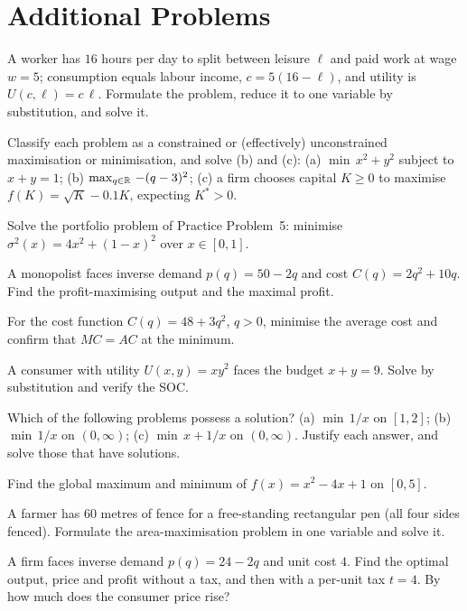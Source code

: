 \section{Additional Problems}

\begin{problems}
  \item A worker has $16$ hours per day to split between leisure
        $\ell$ and paid work at wage $w=5$; consumption equals labour
        income, $c=5(16-\ell)$, and utility is $U(c,\ell)=c\,\ell$.
        Formulate the problem, reduce it to one variable by
        substitution, and solve it.
  \item Classify each problem as a constrained or (effectively)
        unconstrained maximisation or minimisation, and solve (b) and
        (c): (a) $\min\, x^{2}+y^{2}$ subject to $x+y=1$;
        (b) $\max_{q\in\mathbb{R}}\, -(q-3)^{2}$;
        (c) a firm chooses capital $K\ge 0$ to maximise
        $f(K)=\sqrt{K}-0.1K$, expecting $K^{*}>0$.
  \item Solve the portfolio problem of Practice Problem~5: minimise
        $\sigma^{2}(x)=4x^{2}+(1-x)^{2}$ over $x\in[0,1]$.
  \item A monopolist faces inverse demand $p(q)=50-2q$ and cost
        $C(q)=2q^{2}+10q$. Find the profit-maximising output and the
        maximal profit.
  \item For the cost function $C(q)=48+3q^{2}$, $q>0$, minimise the
        average cost and confirm that $MC=AC$ at the minimum.
  \item A consumer with utility $U(x,y)=xy^{2}$ faces the budget
        $x+y=9$. Solve by substitution and verify the SOC.
  \item Which of the following problems possess a solution?
        (a) $\min\, 1/x$ on $[1,2]$; (b) $\min\, 1/x$ on $(0,\infty)$;
        (c) $\min\, x+1/x$ on $(0,\infty)$. Justify each answer, and
        solve those that have solutions.
  \item Find the global maximum and minimum of $f(x)=x^{2}-4x+1$ on
        $[0,5]$.
  \item A farmer has $60$ metres of fence for a free-standing
        rectangular pen (all four sides fenced). Formulate the
        area-maximisation problem in one variable and solve it.
  \item A firm faces inverse demand $p(q)=24-2q$ and unit cost $4$.
        Find the optimal output, price and profit without a tax, and
        then with a per-unit tax $t=4$. By how much does the consumer
        price rise?
\end{problems}

